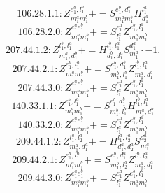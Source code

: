 \documentclass[letterpaper,10pt,fleqn,leqno,onecolumn]{article}
\begin{document}
\begin{equation} \;\;\;\;\;\;  106.28.1.1: Z^{e_{1}^{b},l_{1}^{a}}_{m_{1}^{a}m_{1}^{b}}+=S^{e_{1}^{b},d_{1}^{a}}_{m_{1}^{a}m_{1}^{b}}H^{l_{1}^{a}}_{d_{1}^{a}} \end{equation}
\begin{equation} \;\;\;\;\;\;  106.28.2.0: Z^{e_{1}^{a}e_{1}^{b}}_{m_{1}^{a}m_{1}^{b}}+=S^{e_{1}^{a}}_{l_{1}^{a}}Z^{e_{1}^{b},l_{1}^{a}}_{m_{1}^{a}m_{1}^{b}} \end{equation}
\begin{equation} \;\;\;\;\;\;  207.44.1.2: Z^{l_{1}^{b},l_{1}^{a}}_{m_{1}^{a},d_{1}^{b}}+=H^{l_{1}^{b},l_{1}^{a}}_{d_{1}^{b},d_{1}^{a}}S^{d_{1}^{a}}_{m_{1}^{a}}\cdot -1. \end{equation}
\begin{equation} \;\;\;\;\;\;  207.44.2.1: Z^{e_{1}^{b},l_{1}^{a}}_{m_{1}^{a}m_{1}^{b}}+=S^{e_{1}^{b},d_{1}^{b}}_{m_{1}^{b},l_{1}^{b}}Z^{l_{1}^{b},l_{1}^{a}}_{m_{1}^{a},d_{1}^{b}} \end{equation}
\begin{equation} \;\;\;\;\;\;  207.44.3.0: Z^{e_{1}^{a}e_{1}^{b}}_{m_{1}^{a}m_{1}^{b}}+=S^{e_{1}^{a}}_{l_{1}^{a}}Z^{e_{1}^{b},l_{1}^{a}}_{m_{1}^{a}m_{1}^{b}} \end{equation}
\begin{equation} \;\;\;\;\;\;  140.33.1.1: Z^{e_{1}^{b},l_{1}^{a}}_{m_{1}^{a}m_{1}^{b}}+=S^{e_{1}^{b},d_{1}^{b}}_{m_{1}^{b},l_{1}^{b}}H^{l_{1}^{b},l_{1}^{a}}_{m_{1}^{a},d_{1}^{b}} \end{equation}
\begin{equation} \;\;\;\;\;\;  140.33.2.0: Z^{e_{1}^{a}e_{1}^{b}}_{m_{1}^{a}m_{1}^{b}}+=S^{e_{1}^{a}}_{l_{1}^{a}}Z^{e_{1}^{b},l_{1}^{a}}_{m_{1}^{a}m_{1}^{b}} \end{equation}
\begin{equation} \;\;\;\;\;\;  209.44.1.2: Z^{l_{1}^{a},l_{2}^{a}}_{m_{1}^{a},d_{1}^{a}}+=H^{l_{1}^{a},l_{2}^{a}}_{d_{1}^{a},d_{2}^{a}}S^{d_{2}^{a}}_{m_{1}^{a}} \end{equation}
\begin{equation} \;\;\;\;\;\;  209.44.2.1: Z^{e_{1}^{b},l_{1}^{a}}_{m_{1}^{a}m_{1}^{b}}+=S^{e_{1}^{b},d_{1}^{a}}_{m_{1}^{b},l_{2}^{a}}Z^{l_{1}^{a},l_{2}^{a}}_{m_{1}^{a},d_{1}^{a}} \end{equation}
\begin{equation} \;\;\;\;\;\;  209.44.3.0: Z^{e_{1}^{a}e_{1}^{b}}_{m_{1}^{a}m_{1}^{b}}+=S^{e_{1}^{a}}_{l_{1}^{a}}Z^{e_{1}^{b},l_{1}^{a}}_{m_{1}^{a}m_{1}^{b}} \end{equation}
\end{document}
